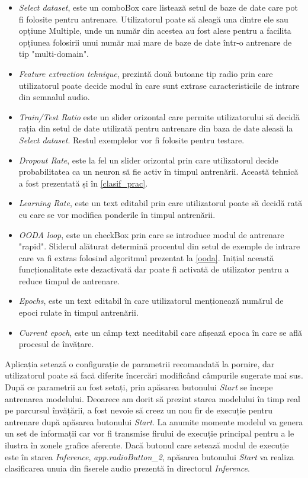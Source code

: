 \documentclass[a4paper,12pt]{book}
\begin{document}
		\begin{itemize}
			\setlength{\leftmargin}{-4cm}
			\item \textit{Select dataset}, este un comboBox care listează setul de baze de date care pot fi folosite pentru antrenare. Utilizatorul poate să aleagă una dintre ele sau opțiune Multiple, unde un număr din acestea au fost alese pentru a facilita opțiunea folosirii unui număr mai mare de baze de date într-o antrenare de tip "multi-domain".
			\item \textit{Feature extraction tehnique}, prezintă două butoane tip radio prin care utilizatorul poate decide modul în care sunt extrase caracteristicile de intrare din semnalul audio. 
			\item \textit{Train/Test Ratio} este un slider orizontal care permite utilizatorului să decidă rația din setul de date utilizată pentru antrenare din baza de date aleasă la \textit{Select dataset}. Restul exemplelor vor fi folosite pentru testare. 
			\item \textit{Dropout Rate}, este la fel un slider orizontal prin care utilizatorul decide probabilitatea ca un neuron să fie activ în timpul antrenării. Această tehnică a fost prezentată și în \ref{clasif_prac}. 
			\item \textit{Learning Rate}, este un text editabil prin care utilizatorul poate să decidă rată cu care se vor modifica ponderile în timpul antrenării. 
			\item \textit{OODA loop}, este un checkBox prin care se introduce modul de antrenare "rapid". Sliderul alăturat determină procentul din setul de exemple de intrare care va fi extras folosind algoritmul prezentat la \ref{ooda}. Inițial această funcționalitate este dezactivată dar poate fi activată de utilizator pentru a reduce timpul de antrenare. 
			\item \textit{Epochs}, este un text editabil în care utilizatorul menționează numărul de epoci rulate în timpul antrenării.
			\item \textit{Current epoch}, este un câmp text needitabil care afișează epoca în care se află procesul de învățare.			
		\end{itemize}
		Aplicația setează o configurație de parametrii recomandată la pornire, dar utilizatorul poate să facă diferite încercări modificând câmpurile sugerate mai sus. După ce parametrii au fost setați, prin apăsarea butonului \textit{Start} se începe antrenarea modelului. Deoarece am dorit să prezint starea modelului în timp real pe parcursul învățării, a fost nevoie să creez un nou fir de execuție pentru antrenare după apăsarea butonului \textit{Start}. La anumite momente modelul va genera un set de informații car vor fi transmise firului de execuție principal pentru a le ilustra în zonele grafice aferente. Dacă butonul care setează modul de execuție este în starea \textit{Inference}, \textit{app.radioButton\_2}, apăsarea butonului \textit{Start} va realiza clasificarea unuia din fiserele audio prezentă în directorul \textit{Inference}.
		
\end{document}
